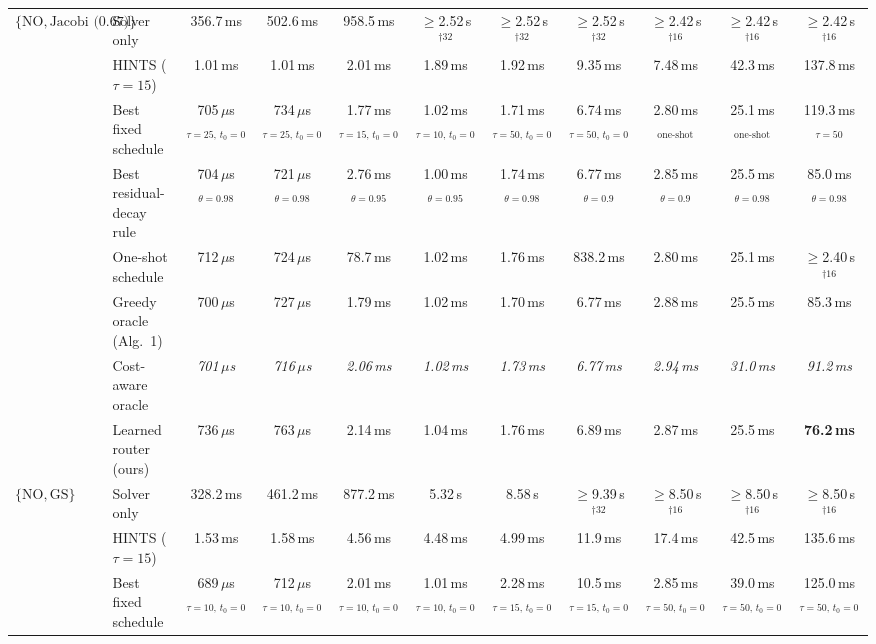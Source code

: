 {\begin{tabular}{llccccccccc}
\midrule
$\{\mathrm{NO}, \text{Jacobi (0.67)}\}$ & Solver only & 356.7\,ms & 502.6\,ms & 958.5\,ms & $\geq$2.52\,s$^{\dagger 32}$ & $\geq$2.52\,s$^{\dagger 32}$ & $\geq$2.52\,s$^{\dagger 32}$ & $\geq$2.42\,s$^{\dagger 16}$ & $\geq$2.42\,s$^{\dagger 16}$ & $\geq$2.42\,s$^{\dagger 16}$ \\
 & HINTS ($\tau{=}15$) & 1.01\,ms & 1.01\,ms & 2.01\,ms & 1.89\,ms & 1.92\,ms & 9.35\,ms & 7.48\,ms & 42.3\,ms & 137.8\,ms \\
 & Best fixed schedule & 705\,$\mu$s$_{\tau{=}25,\,t_0{=}0}$ & 734\,$\mu$s$_{\tau{=}25,\,t_0{=}0}$ & 1.77\,ms$_{\tau{=}15,\,t_0{=}0}$ & 1.02\,ms$_{\tau{=}10,\,t_0{=}0}$ & 1.71\,ms$_{\tau{=}50,\,t_0{=}0}$ & 6.74\,ms$_{\tau{=}50,\,t_0{=}0}$ & 2.80\,ms$_{\text{one-shot}}$ & 25.1\,ms$_{\text{one-shot}}$ & 119.3\,ms$_{\tau{=}50}$ \\
 & Best residual-decay rule & 704\,$\mu$s$_{\theta{=}0.98}$ & 721\,$\mu$s$_{\theta{=}0.98}$ & 2.76\,ms$_{\theta{=}0.95}$ & 1.00\,ms$_{\theta{=}0.95}$ & 1.74\,ms$_{\theta{=}0.98}$ & 6.77\,ms$_{\theta{=}0.9}$ & 2.85\,ms$_{\theta{=}0.9}$ & 25.5\,ms$_{\theta{=}0.98}$ & 85.0\,ms$_{\theta{=}0.98}$ \\
 & One-shot schedule & 712\,$\mu$s & 724\,$\mu$s & 78.7\,ms & 1.02\,ms & 1.76\,ms & 838.2\,ms & 2.80\,ms & 25.1\,ms & $\geq$2.40\,s$^{\dagger 16}$ \\
 & Greedy oracle (Alg.~1) & 700\,$\mu$s & 727\,$\mu$s & 1.79\,ms & 1.02\,ms & 1.70\,ms & 6.77\,ms & 2.88\,ms & 25.5\,ms & 85.3\,ms \\
 & Cost-aware oracle & \textit{701\,$\mu$s} & \textit{716\,$\mu$s} & \textit{2.06\,ms} & \textit{1.02\,ms} & \textit{1.73\,ms} & \textit{6.77\,ms} & \textit{2.94\,ms} & \textit{31.0\,ms} & \textit{91.2\,ms} \\
 & Learned router (ours) & 736\,$\mu$s & 763\,$\mu$s & 2.14\,ms & 1.04\,ms & 1.76\,ms & 6.89\,ms & 2.87\,ms & 25.5\,ms & \textbf{76.2\,ms} \\
\midrule
$\{\mathrm{NO}, \text{GS}\}$ & Solver only & 328.2\,ms & 461.2\,ms & 877.2\,ms & 5.32\,s & 8.58\,s & $\geq$9.39\,s$^{\dagger 32}$ & $\geq$8.50\,s$^{\dagger 16}$ & $\geq$8.50\,s$^{\dagger 16}$ & $\geq$8.50\,s$^{\dagger 16}$ \\
 & HINTS ($\tau{=}15$) & 1.53\,ms & 1.58\,ms & 4.56\,ms & 4.48\,ms & 4.99\,ms & 11.9\,ms & 17.4\,ms & 42.5\,ms & 135.6\,ms \\
 & Best fixed schedule & 689\,$\mu$s$_{\tau{=}10,\,t_0{=}0}$ & 712\,$\mu$s$_{\tau{=}10,\,t_0{=}0}$ & 2.01\,ms$_{\tau{=}10,\,t_0{=}0}$ & 1.01\,ms$_{\tau{=}10,\,t_0{=}0}$ & 2.28\,ms$_{\tau{=}15,\,t_0{=}0}$ & 10.5\,ms$_{\tau{=}15,\,t_0{=}0}$ & 2.85\,ms$_{\tau{=}50,\,t_0{=}0}$ & 39.0\,ms$_{\tau{=}50,\,t_0{=}0}$ & 125.0\,ms$_{\tau{=}50,\,t_0{=}0}$ \\

\end{tabular}}
